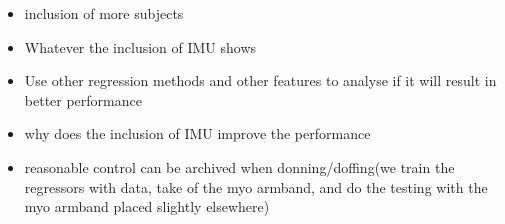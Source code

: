 \begin{itemize}
	\item inclusion of more subjects
	\item Whatever the inclusion of IMU shows 
	
	\item Use other regression methods and other features to analyse if it will result in better performance
	\item why does the inclusion of IMU improve the performance
	\item reasonable control can be archived when donning/doffing(we train the regressors with data, take of the myo armband, and do the testing with the myo armband placed slightly elsewhere)
	
\end{itemize}
	
	
	


	
	

